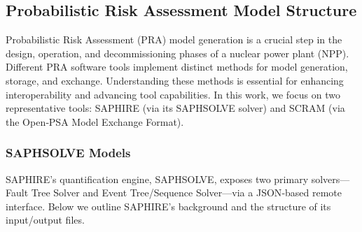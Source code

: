 
\subsection{Probabilistic Risk Assessment Model Structure}
\label{sec:pra_model_structure}

Probabilistic Risk Assessment (PRA) model generation is a crucial step in the design, operation, and decommissioning phases of a nuclear power plant (NPP). Different PRA software tools implement distinct methods for model generation, storage, and exchange. Understanding these methods is essential for enhancing interoperability and advancing tool capabilities. In this work, we focus on two representative tools: SAPHIRE (via its SAPHSOLVE solver) and SCRAM (via the Open‑PSA Model Exchange Format).

\subsubsection{SAPHSOLVE Models}
\label{sec:saphsolve_models}

SAPHIRE’s quantification engine, SAPHSOLVE, exposes two primary solvers—Fault Tree Solver and Event Tree/Sequence Solver—via a JSON‑based remote interface. Below we outline SAPHIRE’s background and the structure of its input/output files.

